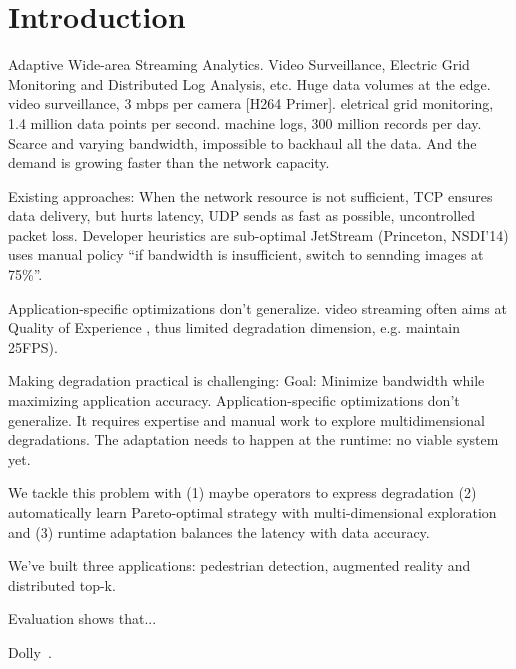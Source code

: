 \section{Introduction}

Adaptive Wide-area Streaming Analytics. Video Surveillance, Electric Grid
Monitoring and Distributed Log Analysis, etc. Huge data volumes at the
edge. video surveillance, 3 mbps per camera [H264 Primer]. eletrical grid
monitoring, 1.4 million data points per second. machine logs, 300 million
records per day. Scarce and varying bandwidth, impossible to backhaul all the
data. And the demand is growing faster than the network capacity.

Existing approaches: When the network resource is not sufficient, TCP ensures
data delivery, but hurts latency, UDP sends as fast as possible, uncontrolled
packet loss. Developer heuristics are sub-optimal JetStream (Princeton, NSDI'14)
uses manual policy ``if bandwidth is insufficient, switch to sennding images at
75\%''.

Application-specific optimizations don't generalize. video streaming often aims
at Quality of Experience , thus limited degradation dimension, e.g. maintain
25FPS).

Making degradation practical is challenging: Goal: Minimize bandwidth while
maximizing application accuracy. Application-specific optimizations don't
generalize. It requires expertise and manual work to explore multidimensional
degradations. The adaptation needs to happen at the runtime: no viable system
yet.

We tackle this problem with (1) maybe operators to express degradation (2)
automatically learn Pareto-optimal strategy with multi-dimensional exploration
and (3) runtime adaptation balances the latency with data accuracy.

We've built three applications: pedestrian detection, augmented reality and
distributed top-k.

Evaluation shows that...

Dolly~\cite{ananthanarayanan2013effective}.

